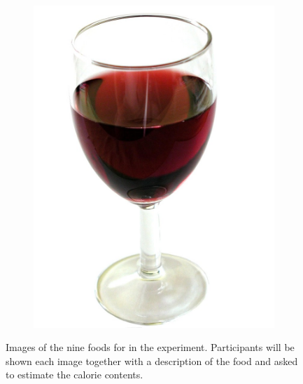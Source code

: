 \documentclass[a4paper,doc,natbib]{apa6}
\begin{document}
\begin{figure}[h!]
\begin{subfigure}[b]{0.28\textwidth}
            \includegraphics[width=0.95\linewidth]{Images/wine.jpg}
        \end{subfigure}
        \caption{Images of the nine foods for in the experiment. Participants will be shown each image together with a description of the food and asked to estimate the calorie contents.}
        \label{fig:foods}
    \end{figure}
\end{document}
